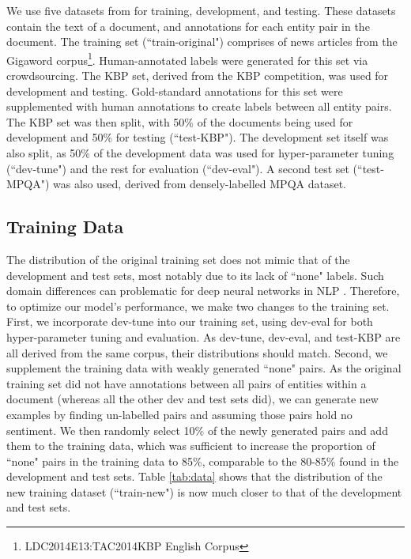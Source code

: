 \documentclass[11pt,a4paper]{article}
\begin{document}
We use five datasets from \citet{Choi:16} for training, development, and testing.
These datasets contain the text of a document, and annotations for each entity pair in the document.
The training set (``train-original") comprises of news articles from the Gigaword corpus\footnote{LDC2014E13:TAC2014KBP English Corpus}.
Human-annotated labels were generated for this set via crowdsourcing.
The KBP set, derived from the KBP competition, was used for development and testing.
Gold-standard annotations for this set were supplemented with human annotations to create labels between all entity pairs.
The KBP set was then split, with 50\% of the documents being used for development and 50\% for testing (``test-KBP"). 
The development set itself was also split, as 50\% of the development data was used for hyper-parameter tuning (``dev-tune") and the rest for evaluation (``dev-eval").
A second test set (``test-MPQA") was also used, derived from densely-labelled MPQA dataset.

\subsection{Training Data}
\par The distribution of the original training set does not mimic that of the development and test sets, most notably due to its lack of ``none" labels.
Such domain differences can problematic for deep neural networks in NLP \citep{Mou:16}.
Therefore, to optimize our model's performance, we make two changes to the training set.
First, we incorporate dev-tune into our training set, using dev-eval for both hyper-parameter tuning and evaluation.
As dev-tune, dev-eval, and test-KBP are all derived from the same corpus, their distributions should match.
Second, we supplement the training data with weakly generated ``none" pairs.
As the original training set did not have annotations between all pairs of entities within a document (whereas all the other dev and test sets did), we can generate new examples by finding un-labelled pairs and assuming those pairs hold no sentiment.
We then randomly select 10\% of the newly generated pairs and add them to the training data, which was sufficient to increase the proportion of ``none" pairs in the training data to 85\%, comparable to the 80-85\% found in the development and test sets.
Table \ref{tab:data} shows that the distribution of the new training dataset (``train-new") is now much closer to that of the development and test sets.
\end{document}
